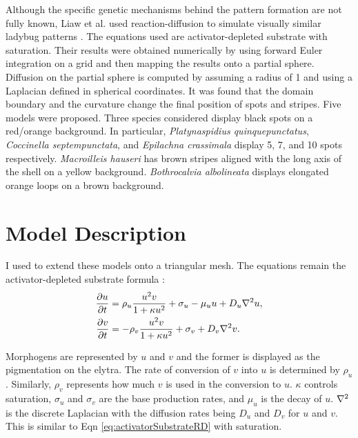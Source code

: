 
Although the specific genetic mechanisms behind the pattern formation are not fully known, Liaw et al. used reaction-diffusion to simulate visually similar ladybug patterns \cite{Liaw2001}. The equations used are activator-depleted substrate with saturation. Their results were obtained numerically by using forward Euler integration on a grid and then mapping the results onto a partial sphere. Diffusion on the partial sphere is computed by assuming a radius of 1 and using a Laplacian defined in spherical coordinates. It was found that the domain boundary and the curvature change the final position of spots and stripes. Five models were proposed. Three species considered display black spots on a red/orange background. In particular, \textit{Platynaspidius quinquepunctatus}, \textit{Coccinella septempunctata}, and \textit{Epilachna crassimala} display 5, 7, and 10 spots respectively. \textit{Macroilleis hauseri} has brown stripes aligned with the long axis of the shell on a yellow background. \textit{Bothrocalvia albolineata} displays elongated orange loops on a brown background.

\section{Model Description} 
I used \ProgramName{} to extend these models onto a triangular mesh. The equations remain the activator-depleted substrate formula \cite{Gierer1972}:
\begin{equation}
	\begin{aligned} \label{eq:ladybugRD}
   \frac{\partial u}{\partial t} &= \rho_u \frac{u^2v}{1+\kappa u^2} + \sigma_u - \mu_u u + D_u \nabla^2 u, \\
   \frac{\partial v}{\partial t} &= -\rho_v \frac{u^2v}{1+\kappa u^2} + \sigma_v + D_v \nabla^2 v.
	\end{aligned}
\end{equation}

Morphogens are represented by $u$ and $v$ and the former is displayed as the pigmentation on the elytra. The rate of conversion of $v$ into $u$ is determined by $\rho_u$. Similarly, $\rho_v$ represents how much $v$ is used in the conversion to $u$. $\kappa$ controls saturation, $\sigma_u$ and $\sigma_v$ are the base production rates, and $\mu_u$ is the decay of $u$. $\nabla^2$ is the discrete Laplacian with the diffusion rates being $D_u$ and $D_v$ for $u$ and $v$. This is similar to Eqn \ref{eq:activatorSubstrateRD} with saturation.

